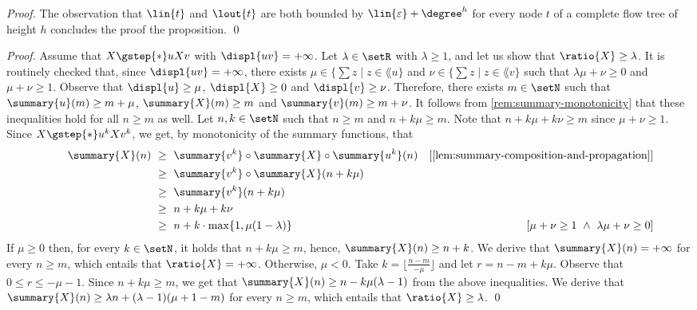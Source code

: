 \begin{proof}
  \medskip

  The observation that $\lin{t}$ and $\lout{t}$ are both bounded by
$\lin{\varepsilon} + \degree^h$ for every node $t$ of a complete flow tree of height $h$
  concludes the proof the proposition.
  \qed
\end{proof}

\ratioinfinite*
\begin{proof}
  Assume that $X \gstep{*} u X v$ with $\displ{uv}=+\infty$.
  Let $\lambda \in \setR$ with $\lambda \geq 1$,
  and let us show that $\ratio{X} \geq \lambda$.
  It is routinely checked that,
  since $\displ{uv}=+\infty$,
  there exists $\mu \in \{\sum z \mid z \in \lang{u}\}$ and
  $\nu \in \{\sum z \mid z \in \lang{v}\}$ such that
  $\lambda \mu + \nu \geq 0$ and
  $\mu + \nu \geq 1$.
  Observe that
  $\displ{u} \geq \mu$,
  $\displ{X} \geq 0$ and
  $\displ{v} \geq \nu$.
  Therefore,
  there exists $m \in \setN$  such that
  $\summary{u}(m) \geq m + \mu$,
  $\summary{X}(m) \geq m$ and
  $\summary{v}(m) \geq m + \nu$.
  It follows from \cref{rem:summary-monotonicity} that
  these inequalities hold for all $n \geq m$ as well.
  Let $n, k \in \setN$ such that $n \geq m$ and
  $n + k\mu \geq m$.
  Note that $n + k\mu + k\nu \geq m$ since $\mu + \nu \geq 1$.
  Since $X \gstep{*} u^k X v^k$,
  we get, by monotonicity of the summary functions,
  that
  \begin{align*}
    \qquad
    \summary{X}(n)
    & \ \geq \ \summary{v^k} \circ \summary{X} \circ \summary{u^k} (n) & [\text{\cref{lem:summary-composition-and-propagation}}]\\
    & \ \geq \ \summary{v^k} \circ \summary{X} (n + k\mu)\\
    & \ \geq \ \summary{v^k} (n + k\mu)\\
    & \ \geq \ n + k\mu + k\nu\\
    & \ \geq \ n + k \cdot \max \{1, \mu (1 - \lambda)\} & [\mu + \nu \geq 1 \ \wedge \ \lambda \mu + \nu \geq 0]
  \end{align*}
  If $\mu \geq 0$ then, for every $k \in \setN$,
  it holds that $n + k\mu \geq m$, hence, $\summary{X}(n) \geq n + k$.
  We derive that $\summary{X}(n) = +\infty$ for every $n \geq m$,
  which entails that $\ratio{X} = +\infty$.
  Otherwise, $\mu < 0$.
  Take $k = \lfloor \frac{n-m}{-\mu}\rfloor$ and let
  $r = n - m + k\mu$.
  Observe that $0 \leq r \leq -\mu - 1$.
  Since $n + k\mu \geq m$,
  we get that
  $\summary{X}(n) \geq n - k\mu (\lambda - 1)$
  from the above inequalities.
  We derive that
  $\summary{X}(n) \geq \lambda n + (\lambda - 1)(\mu + 1 - m)$
  for every $n \geq m$,
  which entails that $\ratio{X} \geq \lambda$.
  \qed
\end{proof}

